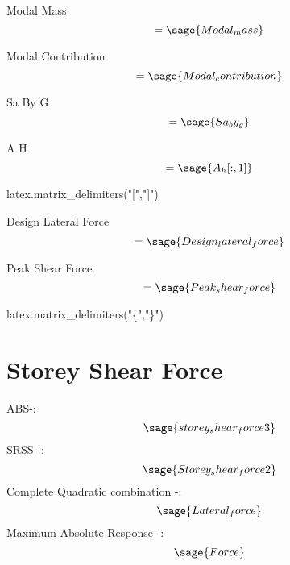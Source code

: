 \documentclass[12pt]{report}
\begin{document}
Modal Mass
\begin{equation}
	 [M_{{m}}]=\sage{Modal_mass}
\end{equation}

Modal Contribution
\begin{equation}
	[M_{{c}}]=\sage{Modal_contribution}
\end{equation}


Sa By G
\begin{equation}
	 [S_{{a}}]=\sage{Sa_by_g}
\end{equation}

A H
\begin{equation}
	[A_{{H}}]=\sage{A_h[:,1]}
\end{equation}

\begin{sagesilent}
latex.matrix_delimiters("[","]")

\end{sagesilent}
Design Lateral Force
\begin{equation}
	[F]=\sage{Design_lateral_force}
\end{equation}

Peak Shear Force
\begin{equation}
	[V]=\sage{Peak_shear_force}
\end{equation}


\begin{sagesilent}
latex.matrix_delimiters("\{","\}")
\end{sagesilent}

\section{Storey Shear Force}
ABS-:
\begin{equation}
	\sage{storey_shear_force3}
\end{equation}
SRSS -:
\begin{equation}
	\sage{Storey_shear_force2}
\end{equation}
Complete Quadratic combination -:
\begin{equation}
	\sage{Lateral_force}
\end{equation}
Maximum Absolute Response -:
\begin{equation}
	\sage{Force}
\end{equation}
\end{document}
